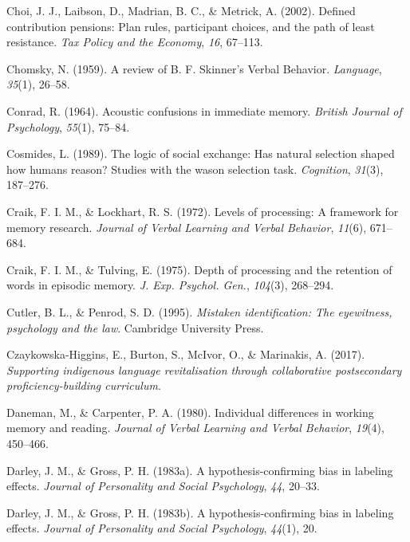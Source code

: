\documentclass[
]{krantz}
\newlength{\cslhangindent}
\newenvironment{CSLReferences}[2] %
 {\begin{list}{}{%
  \setlength{\itemindent}{0pt}
  \setlength{\leftmargin}{0pt}
  \setlength{\parsep}{0pt}
  \ifodd #1
   \setlength{\leftmargin}{\cslhangindent}
   \setlength{\itemindent}{-1\cslhangindent}
  \fi
  \setlength{\itemsep}{#2\baselineskip}}}
 {\end{list}}
\begin{document}
\begin{CSLReferences}{1}{0}
Choi, J. J., Laibson, D., Madrian, B. C., \& Metrick, A. (2002). Defined contribution pensions: Plan rules, participant choices, and the path of least resistance. \emph{Tax Policy and the Economy}, \emph{16}, 67--113.

Chomsky, N. (1959). A review of {B}. {F}. {S}kinner's {V}erbal {B}ehavior. \emph{Language}, \emph{35}(1), 26--58.

Conrad, R. (1964). Acoustic confusions in immediate memory. \emph{British Journal of Psychology}, \emph{55}(1), 75--84.

Cosmides, L. (1989). The logic of social exchange: Has natural selection shaped how humans reason? Studies with the wason selection task. \emph{Cognition}, \emph{31}(3), 187--276.

Craik, F. I. M., \& Lockhart, R. S. (1972). Levels of processing: A framework for memory research. \emph{Journal of Verbal Learning and Verbal Behavior}, \emph{11}(6), 671--684.

Craik, F. I. M., \& Tulving, E. (1975). Depth of processing and the retention of words in episodic memory. \emph{J. Exp. Psychol. Gen.}, \emph{104}(3), 268--294.

Cutler, B. L., \& Penrod, S. D. (1995). \emph{Mistaken identification: The eyewitness, psychology and the law}. Cambridge University Press.

Czaykowska-Higgins, E., Burton, S., McIvor, O., \& Marinakis, A. (2017). \emph{Supporting indigenous language revitalisation through collaborative postsecondary proficiency-building curriculum}.

Daneman, M., \& Carpenter, P. A. (1980). Individual differences in working memory and reading. \emph{Journal of Verbal Learning and Verbal Behavior}, \emph{19}(4), 450--466.

Darley, J. M., \& Gross, P. H. (1983a). A hypothesis-confirming bias in labeling effects. \emph{Journal of Personality and Social Psychology}, \emph{44}, 20--33.

Darley, J. M., \& Gross, P. H. (1983b). A hypothesis-confirming bias in labeling effects. \emph{Journal of Personality and Social Psychology}, \emph{44}(1), 20.


\end{CSLReferences}
\end{document}
